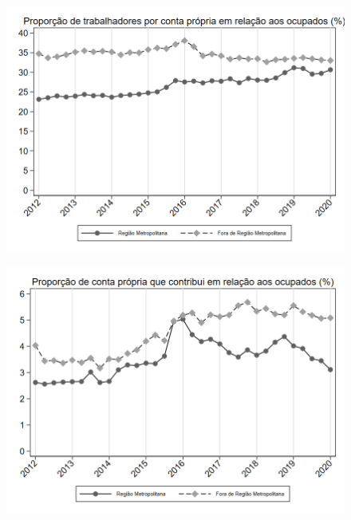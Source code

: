 \begin{frame}[label=_composicao_demografica_regiao_metro_prop_cpropria]{}
\textit{\hyperlink{_composicao_demografica_regiao_metro}{}}
\begin{figure}
  \centering
  \includegraphics[width=1.0\linewidth]{../../analysis/output/composicao_demografica/area_geografica/_composicao_demografica_regiao_metro_prop_cpropria.png}
  \caption{}
  \label{fig:_composicao_demografica_regiao_metro_prop_cpropria}
\end{figure}
\end{frame}

\begin{frame}[label=_composicao_demografica_regiao_metro_prop_cpropriaC]{}
\textit{\hyperlink{_composicao_demografica_regiao_metro}{}}
\begin{figure}
  \centering
  \includegraphics[width=1.0\linewidth]{../../analysis/output/composicao_demografica/area_geografica/_composicao_demografica_regiao_metro_prop_cpropriaC.png}
  \caption{}
  \label{fig:_composicao_demografica_regiao_metro_prop_cpropriaC}
\end{figure}
\end{frame}

